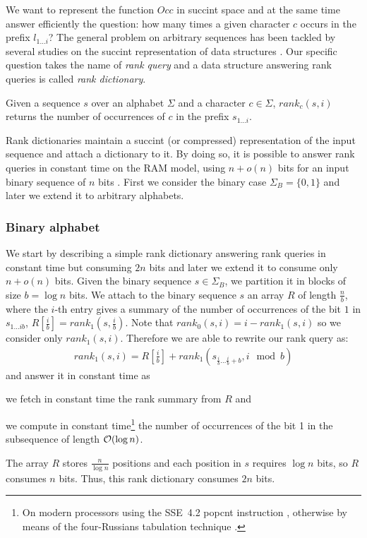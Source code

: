 We want to represent the function $Occ$ in succint space and at the same time answer efficiently the question: how many times a given character $c$ occurs in the prefix $l_{1 \dots i}$?
The general problem on arbitrary sequences has been tackled by several studies on the succint representation of data structures \citep{Jacobson1989}.
Our specific question takes the name of \emph{rank query} and a data structure answering rank queries is called \emph{rank dictionary}.

\begin{definition}
Given a sequence $s$ over an alphabet $\Sigma$ and a character $c \in \Sigma$, $rank_c(s, i)$ returns the number of occurrences of $c$ in the prefix $s_{1 \dots i}$.
\end{definition}

Rank dictionaries maintain a succint (or compressed) representation of the input sequence and attach a dictionary to it.
By doing so, it is possible to answer rank queries in constant time on the RAM model, using $n+o(n)$ bits for an input binary sequence of $n$ bits \citep{Jacobson1989}.
First we consider the binary case $\Sigma_B = \{ 0, 1 \}$ and later we extend it to arbitrary alphabets.

\subsubsection{Binary alphabet}

We start by describing a simple rank dictionary answering rank queries in constant time but consuming $2n$ bits and later we extend it to consume only $n + o(n)$ bits.
Given the binary sequence $s \in \Sigma_B$, we partition it in blocks of size $b=\log{n}$ bits.
We attach to the binary sequence $s$ an array $R$ of length $\frac{n}{b}$, where the $i$-th entry gives a summary of the number of occurrences of the bit $1$ in $s_{1 \dots i b}$, \ie $R[\frac{i}{b}] = rank_1(s, \frac{i}{b})$.
Note that $rank_0(s, i) = i - rank_1(s, i)$ so we consider only $rank_1(s, i)$.
Therefore we are able to rewrite our rank query as:
\begin{eqnarray}
rank_1(s,i) = R[\frac{i}{b}] + rank_1(s_{\frac{i}{b} \dots \frac{i}{b}+b}, i \mod{b})
\end{eqnarray}
and answer it in constant time as 
\begin{inparaenum}[(i)]
\item \label{itm:fetch} we fetch in constant time the rank summary from $R$ and
\item \label{itm:count} we compute in constant time\footnote{On modern processors using the SSE~4.2 popcnt instruction \citep{Intel}, otherwise by means of the four-Russians tabulation technique \citep{Arlazarov1975}.} the number of occurrences of the bit 1 in the subsequence of length $\mathcal{O}(\log{n})$.
\end{inparaenum}
The array $R$ stores $\frac{n}{\log{n}}$ positions and each position in $s$ requires $\log{n}$ bits, so $R$ consumes $n$ bits.
Thus, this rank dictionary consumes $2n$ bits.

